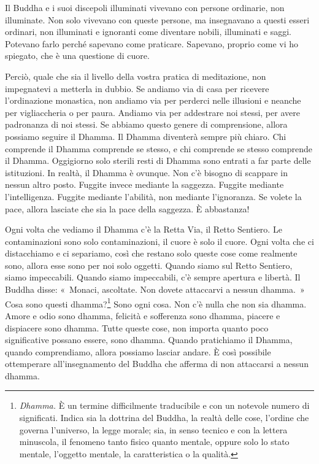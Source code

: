 Il Buddha e i suoi discepoli illuminati vivevano con persone ordinarie,
non illuminate. Non solo vivevano con queste persone, ma insegnavano a
questi esseri ordinari, non illuminati e ignoranti come diventare
nobili, illuminati e saggi. Potevano farlo perché sapevano come
praticare. Sapevano, proprio come vi ho spiegato, che è una questione di
cuore.

Perciò, quale che sia il livello della vostra pratica di meditazione,
non impegnatevi a metterla in dubbio. Se andiamo via di casa per
ricevere l'ordinazione monastica, non andiamo via per perderci nelle
illusioni e neanche per vigliaccheria o per paura. Andiamo via per
addestrare noi stessi, per avere padronanza di noi stessi. Se abbiamo
questo genere di comprensione, allora possiamo seguire il Dhamma. Il
Dhamma diventerà sempre più chiaro. Chi comprende il Dhamma comprende se
stesso, e chi comprende se stesso comprende il Dhamma. Oggigiorno solo
sterili resti di Dhamma sono entrati a far parte delle istituzioni. In
realtà, il Dhamma è ovunque. Non c'è bisogno di scappare in nessun altro
posto. Fuggite invece mediante la saggezza. Fuggite mediante
l'intelligenza. Fuggite mediante l'abilità, non mediante l'ignoranza. Se
volete la pace, allora lasciate che sia la pace della saggezza. È
abbastanza!

Ogni volta che vediamo il Dhamma c'è la Retta Via, il Retto Sentiero. Le
contaminazioni sono solo contaminazioni, il cuore è solo il cuore. Ogni
volta che ci distacchiamo e ci separiamo, così che restano solo queste
cose come realmente sono, allora esse sono per noi solo oggetti. Quando
siamo sul Retto Sentiero, siamo impeccabili. Quando siamo impeccabili,
c'è sempre apertura e libertà. Il Buddha disse: «~Monaci, ascoltate. Non
dovete attaccarvi a nessun dhamma.~» Cosa sono questi
dhamma?\footnote{\emph{Dhamma.} È un termine
  difficilmente traducibile e con un notevole numero di significati.
  Indica sia la dottrina del Buddha, la realtà delle cose, l'ordine che
  governa l'universo, la legge morale; sia, in senso tecnico e con la
  lettera minuscola, il fenomeno tanto fisico quanto mentale, oppure
  solo lo stato mentale, l'oggetto mentale, la caratteristica o la
  qualità.} Sono ogni cosa. Non c'è nulla che non sia dhamma.
Amore e odio sono dhamma, felicità e sofferenza sono
dhamma, piacere e dispiacere sono dhamma. Tutte queste
cose, non importa quanto poco significative possano essere, sono
dhamma. Quando pratichiamo il Dhamma, quando comprendiamo, allora
possiamo lasciar andare. È così possibile ottemperare all'insegnamento
del Buddha che afferma di non attaccarsi a nessun dhamma.

